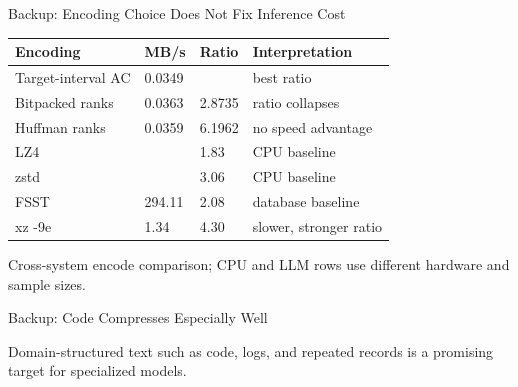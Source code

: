 \begin{frame}{Backup: Encoding Choice Does Not Fix Inference Cost}
  \small
  \begin{tabularx}{\textwidth}{lYYY}
    \toprule
    \textbf{Encoding} & \textbf{MB/s} & \textbf{Ratio} & \textbf{Interpretation} \\
    \midrule
    Target-interval AC & 0.0349 &  & best ratio \\
    Bitpacked ranks & 0.0363 & 2.8735 & ratio collapses \\
    Huffman ranks & 0.0359 & 6.1962 & no speed advantage \\
    \midrule
    LZ4 &  & 1.83 & CPU baseline \\
    zstd &  & 3.06 & CPU baseline \\
    FSST & 294.11 & 2.08 & database baseline \\
    xz -9e & 1.34 & 4.30 & slower, stronger ratio \\
    \bottomrule
  \end{tabularx}
  \vspace{0.4em}
  \tiny Cross-system encode comparison; CPU and LLM rows use different hardware and sample sizes.
\end{frame}

\begin{frame}{Backup: Code Compresses Especially Well}
  \centering
  \par
  \vspace{-0.2em}
  \small Domain-structured text such as code, logs, and repeated records is a promising target for specialized models.
\end{frame}

